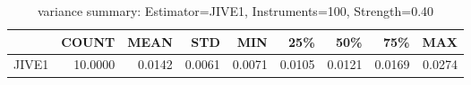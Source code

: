 \begin{table}[ht]
\centering
\caption{variance summary: Estimator=JIVE1, Instruments=100, Strength=0.40}
\begin{tabular}{lrrrrrrrr}
\toprule
 & COUNT & MEAN & STD & MIN & 25\% & 50\% & 75\% & MAX \\
\midrule
JIVE1 & 10.0000 & 0.0142 & 0.0061 & 0.0071 & 0.0105 & 0.0121 & 0.0169 & 0.0274 \\
\bottomrule
\end{tabular}
\end{table}
